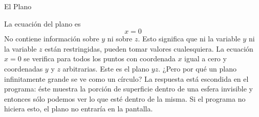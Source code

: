 \documentclass[es]{SurferDesc}%
\begin{document}
\footnotesize
%

\begin{surferPage}
  \begin{surferTitle}El Plano\end{surferTitle}
   \begin{surferText}

La ecuaci\'on del plano es \[x=0\] No contiene informaci\'on sobre $y$ ni sobre $z$. Esto significa que ni la variable $y$ ni la variable $z$ est\'an restringidas, pueden tomar valores cualesquiera. La ecuaci\'on $x=0$ se verifica para todos los puntos con coordenada $x$ igual a cero y coordenadas $y$ y $z$ arbitrarias. Este es el plano $yz$.
\newline \newline
¿Pero por qu\'e un plano infinitamente grande se ve como un c\'irculo? La respuesta est\'a escondida en el programa: \'este muestra la porci\'on de superficie dentro de una esfera invisible y entonces s\'olo podemos ver lo que est\'e dentro de la misma. Si el programa no hiciera esto, el plano no entrar\'ia en la pantalla.

     \end{surferText}
\end{surferPage}

\end{document}
